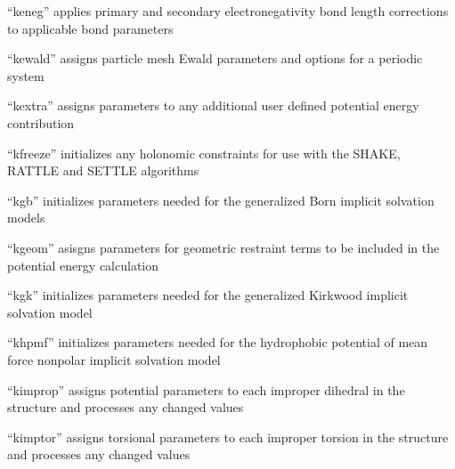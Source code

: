 \documentclass[letterpaper,11pt,english]{sphinxmanual}
\begin{document}
\sphinxAtStartPar
{}

\sphinxAtStartPar
“keneg” applies primary and secondary electronegativity bond length corrections to applicable bond parameters

\sphinxAtStartPar
{}

\sphinxAtStartPar
“kewald” assigns particle mesh Ewald parameters and options for a periodic system

\sphinxAtStartPar
{}

\sphinxAtStartPar
“kextra” assigns parameters to any additional user defined potential energy contribution

\sphinxAtStartPar
{}

\sphinxAtStartPar
“kfreeze” initializes any holonomic constraints for use with the SHAKE, RATTLE and SETTLE algorithms

\sphinxAtStartPar
{}

\sphinxAtStartPar
“kgb” initializes parameters needed for the generalized Born implicit solvation models

\sphinxAtStartPar
{}

\sphinxAtStartPar
“kgeom” asisgns parameters for geometric restraint terms to be included in the potential energy calculation

\sphinxAtStartPar
{}

\sphinxAtStartPar
“kgk” initializes parameters needed for the generalized Kirkwood implicit solvation model

\sphinxAtStartPar
{}

\sphinxAtStartPar
“khpmf” initializes parameters needed for the hydrophobic potential of mean force nonpolar implicit solvation model

\sphinxAtStartPar
{}

\sphinxAtStartPar
“kimprop” assigns potential parameters to each improper dihedral in the structure and processes any changed values

\sphinxAtStartPar
{}

\sphinxAtStartPar
“kimptor” assigns torsional parameters to each improper torsion in the structure and processes any changed values

\sphinxAtStartPar
{}
\end{document}
